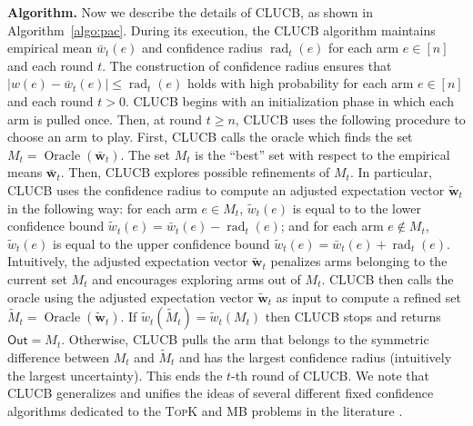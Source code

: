 \documentclass{article}
\newcommand{\wei}[1]{}
\newcommand{\wei}[1]{{\color{blue!50!black}  [\text{Wei:} #1]}}
\newcommand{\Algorithm}{{\small \textsf{CLUCB}}\xspace}
\DeclareMathOperator{\rad}{rad}
\DeclareMathOperator{\Oracle}{Oracle}
\newcommand{\out}{\mathsf{Out}}
\newcommand{\MultiIdent}{\textsc{TopK}\xspace}
\newcommand{\MultiBandit}{\textsc{MB}\xspace}
\renewcommand{\vec}[1]{\boldsymbol{#1}}
\begin{document}
\textbf{Algorithm.} 
Now we describe the details of \Algorithm, as shown in Algorithm~\ref{algo:pac}.
%
During its execution, the \Algorithm algorithm maintains empirical mean $\bar w_t(e)$ and confidence radius $\rad_t(e)$ for each arm $e\in[n]$ and each round $t$.
The construction of confidence radius ensures that $|w(e)-\bar w_t(e)| \le \rad_t(e)$ holds with high probability for each arm $e \in [n]$ and each round $t>0$.
\Algorithm begins with an initialization phase in which each arm is pulled once.
Then, at round $t \ge n$, \Algorithm uses the following procedure to choose an arm to play. 
First, \Algorithm calls the oracle which finds the set $M_t=\Oracle(\vec {\bar w}_t)$. 
The set $M_t$ is the ``best'' set with respect to the empirical means $\vec {\bar w}_t$.
Then, \Algorithm explores possible refinements of $M_t$. 
In particular, \Algorithm uses the confidence radius to compute an adjusted expectation vector $\vec {\tilde w}_t$ in the following way: for each arm $e \in M_t$, $\tilde w_t(e)$ is equal to to the lower confidence bound $\tilde w_t(e) = \bar w_t(e)-\rad_t(e)$; and for each arm $e\not\in M_t$, $\tilde w_t(e)$ is equal to the upper confidence bound $\tilde w_t(e)=\bar w_t(e)+\rad_t(e)$.
Intuitively, the adjusted expectation vector $\vec {\tilde w}_t$ penalizes arms belonging to the current set $M_t$ and encourages exploring arms out of $M_t$.
\Algorithm then calls the oracle using the adjusted expectation vector $\vec {\tilde w}_t$ as input to compute a refined set $\tilde M_t = \Oracle(\vec {\tilde w}_t)$.
If $\tilde w_t(\tilde M_t) = \tilde w_t(M_t)$ then \Algorithm stops and returns $\out=M_t$.
Otherwise, \Algorithm pulls the arm that belongs to the symmetric difference  between $M_t$ and $\tilde M_t$ and has the largest confidence radius (intuitively the largest uncertainty).
This ends the $t$-th round of \Algorithm.
We note that \Algorithm generalizes and unifies the ideas of several different fixed confidence algorithms dedicated to the \MultiIdent and \MultiBandit problems in the literature \citep{kalyanakrishnan2012pac,gabillon2012best,kaufmann2013information}.
\end{document}
